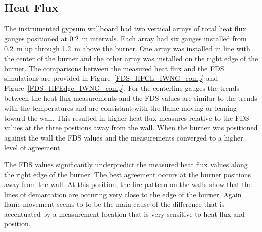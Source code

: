 \documentclass[twoside]{uocthesis}
\begin{document}
{\subsection{Heat Flux}

The instrumented gypsum wallboard had two vertical arrays of total heat flux gauges positioned at 0.2~m intervals.  Each array had six gauges installed from 0.2~m up through 1.2~m above the burner.  One array was installed in line with the center of the burner and the other array was installed on the right edge of the burner.  The comparisons between the measured heat flux and the FDS simulations are provided in Figure~\ref{FDS_HFCL_IWNG_comp} and Figure~\ref{FDS_HFEdge_IWNG_comp}.  For the centerline gauges the trends between the heat flux measurements and the FDS values are similar to the trends with the temperatures and are consistant with the flame moving or leaning toward the wall.  This resulted in higher heat flux measures relative to the FDS values at the three positions away from the wall. When the burner was positioned against the wall the FDS values and the measurements converged to a higher level of agreement. 

The FDS values significantly underpredict the measured heat flux values along the right edge of the burner.  The best agreement occurs at the burner positions away from the wall.  At this position, the fire pattern on the walls show that the lines of demarcation are occuring very close to the edge of the burner.  Again flame movement seems to to be the main cause of the difference that is accentuated by a measurement location that is very sensitive to heat flux and position.           

}
\end{document}
